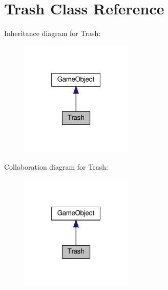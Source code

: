 \hypertarget{class_trash}{}\section{Trash Class Reference}
\label{class_trash}


Inheritance diagram for Trash\+:
\nopagebreak
\begin{figure}[H]
\begin{center}
\leavevmode
\includegraphics[width=151pt]{class_trash__inherit__graph}
\end{center}
\end{figure}


Collaboration diagram for Trash\+:
\nopagebreak
\begin{figure}[H]
\begin{center}
\leavevmode
\includegraphics[width=151pt]{class_trash__coll__graph}
\end{center}
\end{figure}
